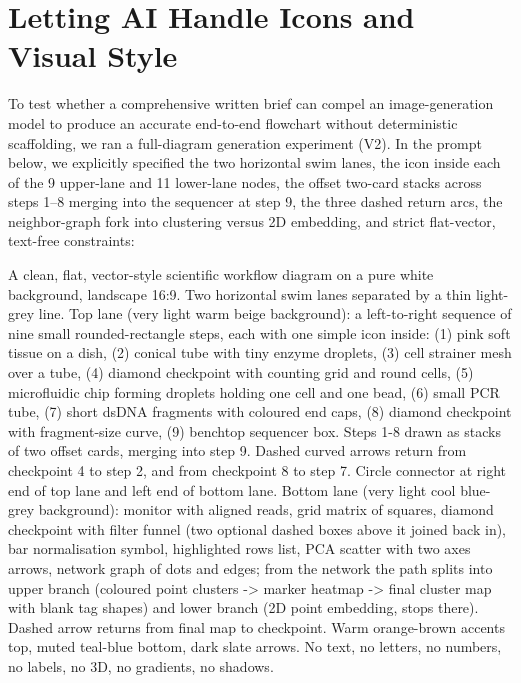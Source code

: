 \section{Letting AI Handle Icons and Visual Style}

To test whether a comprehensive written brief can compel an image-generation model to produce an accurate end-to-end flowchart without deterministic scaffolding, we ran a full-diagram generation experiment (V2). In the prompt below, we explicitly specified the two horizontal swim lanes, the icon inside each of the 9 upper-lane and 11 lower-lane nodes, the offset two-card stacks across steps 1--8 merging into the sequencer at step 9, the three dashed return arcs, the neighbor-graph fork into clustering versus 2D embedding, and strict flat-vector, text-free constraints:

\begin{Prompt}
A clean, flat, vector-style scientific workflow diagram on a pure white background,
landscape 16:9. Two horizontal swim lanes separated by a thin light-grey line.
Top lane (very light warm beige background): a left-to-right sequence of nine small
rounded-rectangle steps, each with one simple icon inside: (1) pink soft tissue on a dish,
(2) conical tube with tiny enzyme droplets, (3) cell strainer mesh over a tube,
(4) diamond checkpoint with counting grid and round cells, (5) microfluidic chip forming
droplets holding one cell and one bead, (6) small PCR tube, (7) short dsDNA fragments
with coloured end caps, (8) diamond checkpoint with fragment-size curve, (9) benchtop
sequencer box. Steps 1-8 drawn as stacks of two offset cards, merging into step 9.
Dashed curved arrows return from checkpoint 4 to step 2, and from checkpoint 8 to step 7.
Circle connector at right end of top lane and left end of bottom lane.
Bottom lane (very light cool blue-grey background): monitor with aligned reads, grid
matrix of squares, diamond checkpoint with filter funnel (two optional dashed boxes above
it joined back in), bar normalisation symbol, highlighted rows list, PCA scatter with two
axes arrows, network graph of dots and edges; from the network the path splits into upper
branch (coloured point clusters -> marker heatmap -> final cluster map with blank tag
shapes) and lower branch (2D point embedding, stops there). Dashed arrow returns from
final map to checkpoint. Warm orange-brown accents top, muted teal-blue bottom, dark slate
arrows. No text, no letters, no numbers, no labels, no 3D, no gradients, no shadows.
\end{Prompt}

